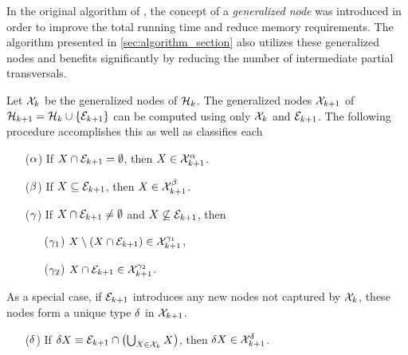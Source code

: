 \documentclass[aps, 10pt, english, twoside, twocolumn, pra, nofootinbib, tightenlines, longbibliography, superscriptaddress]{revtex4-1}
\begin{document}
    In the original algorithm of \citet{Kavvadias_2005}, the concept of a \textit{generalized node} was introduced in order to improve the total running time and reduce memory requirements. The algorithm presented in \cref{sec:algorithm_section} also utilizes these generalized nodes and benefits significantly by reducing the number of intermediate partial transversals.

    Let $\mathcal{X}_{k}$ be the generalized nodes of $\mathcal{H}_{k}$. The generalized nodes $\mathcal{X}_{k+1}$ of $\s H_{k+1} = \s H_{k} \cup \bc{\edges_{k+1}}$ can be computed using only $\mathcal{X}_{k}$ and $\mathcal{E}_{k+1}$. The following procedure accomplishes this as well as classifies each
    \begin{itemize}
        \item[($\alpha$)] If $X \cap \mathcal{E}_{k+1} = \emptyset$, then $X \in \mathcal{X}^{\alpha}_{k+1}$.
        \item[($\beta$)] If $X \subseteq \mathcal{E}_{k+1}$, then $X \in \mathcal{X}^{\beta}_{k+1}$.
        \item[($\gamma$)] If $X \cap \mathcal{E}_{k+1} \neq \emptyset$ and $X \not \subseteq \mathcal{E}_{k+1}$, then
        \begin{itemize}
            \item[($\gamma_1$)] $X \setminus \br{X \cap \edges_{k+1}} \in \s X^{\ga_1}_{k+1}$,
            \item[($\gamma_2$)] $X \cap \mathcal{E}_{k+1} \in \mathcal{X}^{\gamma_2}_{k+1}$.
        \end{itemize}
    \end{itemize}
    As a special case, if $\mathcal{E}_{k+1}$ introduces any new nodes not captured by $\mathcal{X}_{k}$, these nodes form a unique type $\delta$ in $\mathcal{X}_{k+1}$.
    \begin{itemize}
        \item[($\delta$)] If $\de X \defined \edges_{k+1} \cap \br{\bigcup_{X \in \s X_{k}} X}$, then $\delta X \in \mathcal{X}_{k+1}^{\delta}$.
    \end{itemize}
\end{document}
